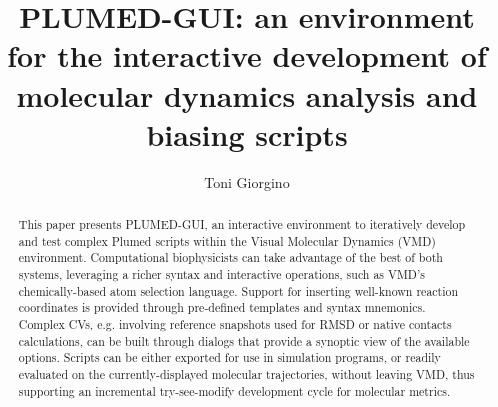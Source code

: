 \documentclass[preprint,12pt]{elsarticle}
\newcommand{\mytitle}{PLUMED-GUI: an environment for the interactive development 
  of molecular dynamics analysis and biasing scripts}
\begin{document}
\begin{frontmatter}


\title{\mytitle}
\author{Toni Giorgino}
\address{Institute of Biomedical Engineering (ISIB),\\ 
National Research Council of Italy (CNR),\\
Padua, Italy}




\begin{abstract}
  This paper presents PLUMED-GUI, an interactive environment to
  iteratively develop and test complex Plumed scripts within the
  Visual Molecular Dynamics (VMD) environment. Computational
  biophysicists can take advantage of the best of both systems,
  leveraging a richer syntax and interactive operations, such as VMD's
  chemically-based atom selection language.  Support for inserting
  well-known reaction coordinates is provided through pre-defined
  templates and syntax mnemonics. Complex CVs, e.g. involving
  reference snapshots used for RMSD or native contacts calculations,
  can be built through dialogs that provide a synoptic view of the
  available options.  Scripts can be either exported for use in
  simulation programs, or readily evaluated on the currently-displayed
  molecular trajectories, without leaving VMD, thus supporting an
  incremental try-see-modify development cycle for molecular metrics.
\end{abstract}


\end{frontmatter}
\end{document}

